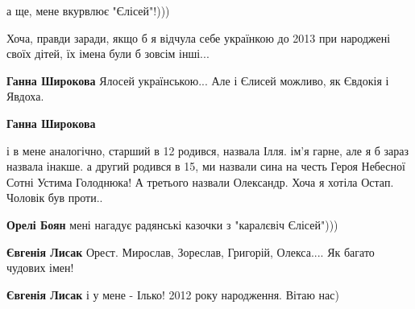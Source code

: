 \begin{itemize}
а ще, мене вкурвлює "Єлісей"!)))

Хоча, правди заради, якщо б я відчула себе українкою до 2013 при народжені
своїх дітей, їх імена були б зовсім інші...

\begin{itemize}
 
\textbf{Ганна Широкова} Ялосей українською... Але і Єлисей можливо, як Євдокія і Явдоха.

 
\textbf{Ганна Широкова} 

і в мене аналогічно, старший в 12 родився, назвала Ілля. ім'я гарне, але я б зараз
назвала інакше. а другий родився в 15, ми назвали сина на честь Героя Небесної
Сотні Устима Голоднюка! А третього назвали Олександр. Хоча я хотіла
Остап. Чоловік був проти..


 
\textbf{Орелі Боян} мені нагадує радянські казочки з "каралєвіч Єлісей")))

 
\textbf{Євгенія Лисак} Орест.
Мирослав, Зореслав, Григорій, Олекса....
Як багато чудових імен!

 
\textbf{Євгенія Лисак} і у мене - Ілько!
2012 року народження.
Вітаю нас)


\end{itemize}
\end{itemize}
